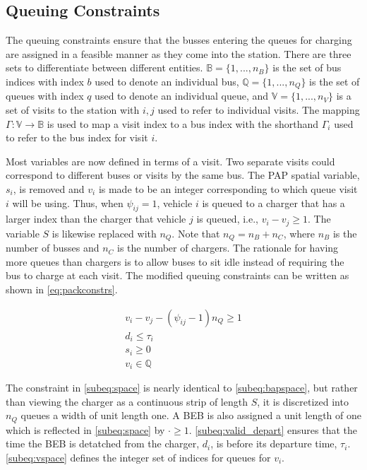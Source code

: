 \documentclass[utf8]{FrontiersinHarvard}
\begin{document}
\subsection{Queuing Constraints}
\label{sec:queuing}
\noindent
The queuing constraints ensure that the busses entering the queues for charging are assigned in a feasible manner as
they come into the station. There are three sets to differentiate between different entities. \(\mathbb{B} = \{1, ...,
n_B\}\) is the set of bus indices with index \(b\) used to denote an individual bus, \(\mathbb{Q} = \{1, ..., n_Q\}\) is the set of
queues with index \(q\) used to denote an individual queue, and \(\mathbb{V} = \{1, ..., n_V\}\) is a set of visits to the
station with \(i,j\) used to refer to individual visits. The mapping \(\Gamma: \mathbb{V} \rightarrow \mathbb{B}\) is used to map a visit
index to a bus index with the shorthand \(\Gamma_i\) used to refer to the bus index for visit \(i\).

Most variables are now defined in terms of a visit. Two separate visits could correspond to different buses or visits by
the same bus. The PAP spatial variable, \(s_i\), is removed and \(v_i\) is made to be an integer corresponding to which
queue visit \(i\) will be using. Thus, when \(\psi_{ij} = 1\), vehicle \(i\) is queued to a charger that has a larger index than
the charger that vehicle \(j\) is queued, i.e., \(v_i-v_j \geq 1\). The variable \(S\) is likewise replaced with \(n_Q\). Note that
\(n_Q = n_B + n_C\), where \(n_B\) is the number of busses and \(n_C\) is the number of chargers. The rationale for having
more queues than chargers is to allow buses to sit idle instead of requiring the bus to charge at each visit. The
modified queuing constraints can be written as shown in \autoref{eq:packconstrs}.

\begin{subequations}
\label{eq:packconstrs}
\begin{align}
    v_i - v_j - (\psi_{ij} - 1)n_Q \geq 1       \label{subeq:space}        \\
    d_i \leq \tau_i                             \label{subeq:valid_depart} \\
    s_i \geq 0                               \label{subeq:pos_charge} \\
    v_i \in \mathbb{Q}                       \label{subeq:vspace}
\end{align}
\end{subequations}

The constraint in \autoref{subeq:space} is nearly identical to \autoref{subeq:bapspace}, but rather than viewing the
charger as a continuous strip of length \(S\), it is discretized into \(n_Q\) queues a width of unit length one. A BEB is
also assigned a unit length of one which is reflected in \autoref{subeq:space} by \(\cdot \geq 1\). \autoref{subeq:valid_depart}
ensures that the time the BEB is detatched from the charger, \(d_i\), is before its departure time, \(\tau_i\).
\autoref{subeq:vspace} defines the integer set of indices for queues for \(v_i\).
\end{document}
